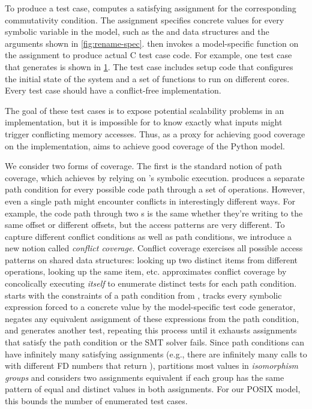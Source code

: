 To produce a test case, \testgen computes
a satisfying assignment for the corresponding commutativity condition.
The assignment specifies concrete values for every symbolic variable in
the model, such as the  and  data structures
and the  arguments shown in \cref{fig:rename-spec}.
\testgen then invokes a model-specific function on the assignment
to produce actual C test case code.  For example, one test
case that \testgen generates is shown in \cref{fig:testgen}.
The test case includes setup code that configures the initial state of
the system and a set of functions to run on different cores. Every
\testgen test case should have a conflict-free implementation.

\begin{figure}
%
\label{fig:testgen}
\end{figure}

The goal of these test cases is to expose potential scalability problems
in an implementation, but it is impossible for \testgen to know
exactly what inputs might trigger conflicting memory accesses.  Thus, as a
proxy for achieving good coverage on the implementation, \testgen
aims to achieve good coverage of the Python model.

We consider two forms of coverage.
The first is the standard notion of path coverage, which \testgen
achieves by relying on \analyzer's symbolic execution.
%
\analyzer produces a separate path condition for every possible code
path through a set of operations.
%
However, even a single path might encounter conflicts in interestingly
different ways.
%
For example, the code path through two s is the
same whether they're writing to the same offset or different offsets,
but the access patterns are very different.
%
To capture different conflict conditions as well as path conditions, we
introduce a new notion called \emph{conflict coverage}.  Conflict coverage
exercises all possible access patterns on shared data structures:
looking up two distinct items from different operations, looking up
the same item, etc.
%
\testgen approximates
conflict coverage by concolically executing \emph{itself}
to enumerate distinct tests for each path condition.  \testgen
starts with the constraints of a path condition from \analyzer, tracks
every symbolic expression forced to a concrete value by the
model-specific test code
generator, negates any equivalent assignment of these expressions from
the path condition, and generates another test, repeating this process
until it exhausts assignments that satisfy the path condition or the SMT
solver fails.  Since
path conditions can have infinitely many satisfying assignments (e.g.,
there are infinitely many calls to  with different FD numbers
that return ), \testgen partitions most values in
\emph{isomorphism groups} and considers two assignments equivalent if
each group has the same
pattern of equal and distinct values in both assignments.  For our POSIX
model, this
bounds the number of enumerated test cases.

